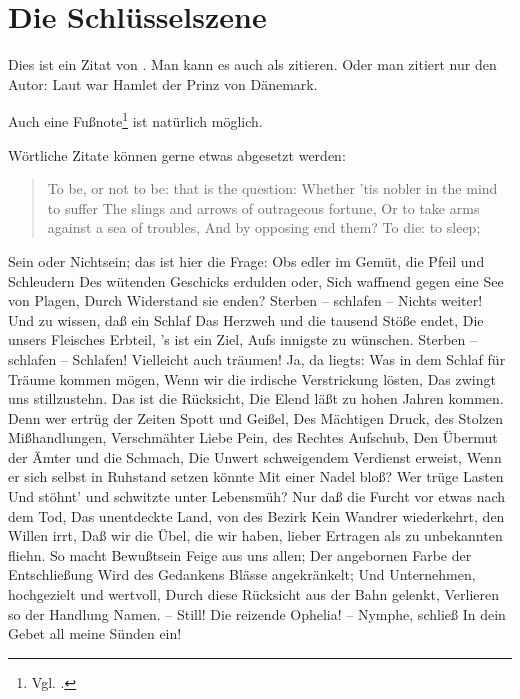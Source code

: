 \chapter{Die Schlüsselszene}

Dies ist ein Zitat von \cite{Hamlet}. Man kann es auch als \citep{Hamlet}
zitieren. Oder man zitiert nur den Autor: Laut \citeauthor{Hamlet} war Hamlet
der Prinz von Dänemark.

Auch eine Fußnote\footnote{Vgl. \cite{JuliusCaesar}.} ist natürlich möglich.

Wörtliche Zitate können gerne etwas abgesetzt werden:

\begin{quote}
To be, or not to be: that is the question:
Whether 'tis nobler in the mind to suffer
The slings and arrows of outrageous fortune,
Or to take arms against a sea of troubles,
And by opposing end them? To die: to sleep;
\citep[Act 3, Scene 1]{Hamlet}
\end{quote}

Sein oder Nichtsein; das ist hier die Frage:
Obs edler im Gemüt, die Pfeil und Schleudern
Des wütenden Geschicks erdulden oder,
Sich waffnend gegen eine See von Plagen,
Durch Widerstand sie enden? Sterben -- schlafen --
Nichts weiter! Und zu wissen, daß ein Schlaf
Das Herzweh und die tausend Stöße endet,
Die unsers Fleisches Erbteil, 's ist ein Ziel,
Aufs innigste zu wünschen. Sterben -- schlafen --
Schlafen! Vielleicht auch träumen! Ja, da liegts:
Was in dem Schlaf für Träume kommen mögen,
Wenn wir die irdische Verstrickung lösten,
Das zwingt uns stillzustehn. Das ist die Rücksicht,
Die Elend läßt zu hohen Jahren kommen.
Denn wer ertrüg der Zeiten Spott und Geißel,
Des Mächtigen Druck, des Stolzen Mißhandlungen,
Verschmähter Liebe Pein, des Rechtes Aufschub,
Den Übermut der Ämter und die Schmach,
Die Unwert schweigendem Verdienst erweist,
Wenn er sich selbst in Ruhstand setzen könnte
Mit einer Nadel bloß? Wer trüge Lasten
Und stöhnt' und schwitzte unter Lebensmüh?
Nur daß die Furcht vor etwas nach dem Tod,
Das unentdeckte Land, von des Bezirk
Kein Wandrer wiederkehrt, den Willen irrt,
Daß wir die Übel, die wir haben, lieber
Ertragen als zu unbekannten fliehn.
So macht Bewußtsein Feige aus uns allen;
Der angebornen Farbe der Entschließung
Wird des Gedankens Blässe angekränkelt;
Und Unternehmen, hochgezielt und wertvoll,
Durch diese Rücksicht aus der Bahn gelenkt,
Verlieren so der Handlung Namen. -- Still!
Die reizende Ophelia! -- Nymphe, schließ
In dein Gebet all meine Sünden ein!

